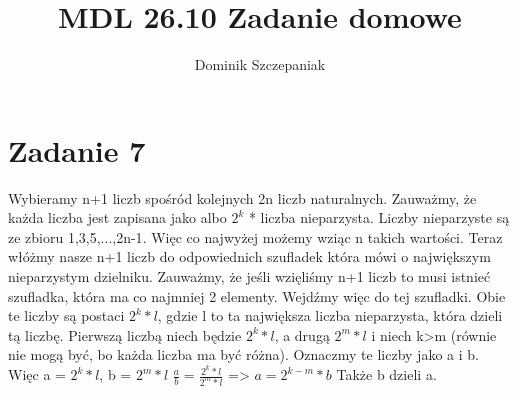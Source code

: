 \documentclass[12pt]{article}
\title{MDL 26.10 Zadanie domowe}
\author{Dominik Szczepaniak}
\begin{document}
\maketitle
\bgroup\obeylines
\section{Zadanie 7}
Wybieramy n+1 liczb spośród kolejnych 2n liczb naturalnych.
Zauważmy, że każda liczba jest zapisana jako albo $2^k$ * liczba nieparzysta. Liczby nieparzyste są ze zbioru {1,3,5,...,2n-1}. Więc co najwyżej możemy wziąc n takich wartości. 
Teraz włóżmy nasze n+1 liczb do odpowiednich szufladek która mówi o największym nieparzystym dzielniku. Zauważmy, że jeśli wzięliśmy n+1 liczb to musi istnieć szufladka, która ma co najmniej 2 elementy.
Wejdźmy więc do tej szufladki. Obie te liczby są postaci $2^k * l$, gdzie l to ta największa liczba nieparzysta, która dzieli tą liczbę.
Pierwszą liczbą niech będzie $2^k * l$, a drugą $2^m * l$ i niech k>m (równie nie mogą być, bo każda liczba ma być różna).
Oznaczmy te liczby jako a i b.
Więc 
a = $2^k * l$, 
b = $2^m * l$ 
$\frac{a}{b} = \frac{2^k * l}{2^m * l}$ => $a = 2^{k-m} * b$
Także b dzieli a. 

\egroup
\end{document}
